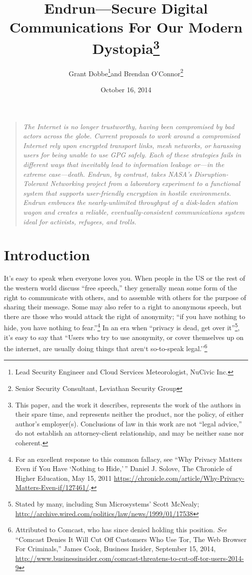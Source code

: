 \documentclass[12pt]{article}
\title{Endrun---Secure Digital Communications For Our Modern Dystopia\footnote{This paper, and the work it describes, represents the work of the authors in their spare time, and represents neither the product, nor the policy, of either author's employer(s). Conclusions of law in this work are not ``legal advice,'' do not establish an attorney-client relationship, and may be neither sane nor coherent.}}
\author{Grant Dobbe\footnote{Lead Security Engineer and Cloud Services Meteorologist, NuCivic Inc.}\space\space and Brendan O'Connor\footnote{Senior Security Consultant, Leviathan Security Group}}
\date{October 16, 2014}
\begin{document}
	
	
	\maketitle
  
  \begin{quote}
    \emph{The Internet is no longer trustworthy, having been compromised by bad actors across the globe. Current proposals to work around a compromised Internet rely upon encrypted transport links, mesh networks, or harassing users for being unable to use GPG safely. Each of these strategies fails in different ways that inevitably lead to information leakage or---in the extreme case---death. Endrun, by contrast, takes NASA's Disruption-Tolerant Networking project from a laboratory experiment to a functional system that supports user-friendly encryption in hostile environments. Endrun embraces the nearly-unlimited throughput of a disk-laden station wagon and creates a reliable, eventually-consistent communications system ideal for activists, refugees, and trolls.}
    \end{quote}
	
	\section{Introduction}
	
  It's easy to speak when everyone loves you. When people in the US or the rest of the western world discuss ``free speech,'' they generally mean some form of the right to communicate with others, and to assemble with others for the purpose of sharing their message. Some may also refer to a right to anonymous speech, but there are those who would attack the right of anonymity; ``if you have nothing to hide, you have nothing to fear.''\footnote{For an excellent response to this common fallacy, see ``Why Privacy Matters Even if You Have `Nothing to Hide,'\,'' Daniel J. Solove, The Chronicle of Higher Education, May 15, 2011 \url{https://chronicle.com/article/Why-Privacy-Matters-Even-if/127461/}.} In an era when ``privacy is dead, get over it''\footnote{Stated by many, including Sun Microsystems' Scott McNealy; \url{http://archive.wired.com/politics/law/news/1999/01/17538}}, it's easy to say that ``Users who try to use anonymity, or cover themselves up on the internet, are usually doing things that aren`t so-to-speak legal.''\footnote{Attributed to Comcast, who has since denied holding this position. \emph{See} ``Comcast Denies It Will Cut Off Customers Who Use Tor, The Web Browser For Criminals,'' James Cook, Business Insider, September 15, 2014, \url{http://www.businessinsider.com/comcast-threatens-to-cut-off-tor-users-2014-9}}
  
\end{document}
